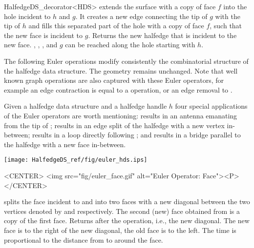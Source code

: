 \begin{ccRefClass}{HalfedgeDS_decorator<HDS>}
   {extends the surface with a copy of face $f$ into the hole 
    incident to $h$ and $g$. It creates a new edge connecting the tip of
    $g$ with the tip of $h$ and fills this separated part of the hole with a
    copy of face $f$, such that the new face is incident to $g$. Returns 
    the new halfedge that is incident to the new face.
    \ccPrecond {}, ,
    ,  and $g$ can be reached 
    along the hole starting with $h$.}



The following Euler operations modify consistently the combinatorial
structure of the halfedge data structure. The geometry remains unchanged.
Note that well known graph operations are also captured with these 
Euler operators, for example an edge contraction is equal to a
 operation, or an edge removal to .

Given a halfedge data structure  and a halfedge handle $h$
four special applications of the Euler operators are worth mentioning:
 results in an antenna emanating from the tip
of ;  results in an edge 
split of the halfedge  with a new vertex in-between;
 results in a loop directly following ;
and  results in a bridge parallel to
the halfedge  with a new face in-between.

\begin{ccTexOnly}
    \begin{center}
      \parbox{\textwidth}{%
          \texttt{[image: HalfedgeDS\_ref/fig/euler\_hds.ips]}%
      }
    \end{center}
\end{ccTexOnly}

\begin{ccHtmlOnly}
    <CENTER>
    <img src="fig/euler_face.gif" alt="Euler Operator: Face"><P>
    </CENTER>
\end{ccHtmlOnly}

    {splits the face incident to  and  into two faces
     with a new diagonal between the two vertices denoted by  and
      respectively. The second (new) face obtained from
      is a copy of the first face. Returns  after the
     operation, i.e., the new diagonal. The new face is to the right of the 
     new diagonal, the old face is to the left. The time is proportional 
     to the distance from  to  around the face.} 


\end{ccRefClass}
